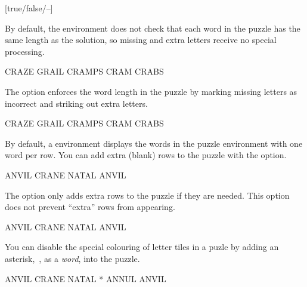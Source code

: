 \documentclass[svgnames]{report}
\begin{document}
  [true/false/--]

  By default, the  environment does not check that each
  word in the puzzle has the same length as the solution, so missing
  and extra letters receive no special processing.

  \begin{example}
  \begin{wordle}[strict=false]{CRAZE} %
    GRAIL
    CRAMPS
    CRAM
    CRABS
  \end{wordle}
  \end{example}

  The  option enforces the word length in the puzzle by
  marking missing letters as incorrect and striking out extra letters.

  \begin{example}
  \begin{wordle}[strict]{CRAZE}
    GRAIL
    CRAMPS
    CRAM
    CRABS
  \end{wordle}
  \end{example}


  By default, a  environment displays the words
  in the puzzle environment with one word per row. You can add extra
  (blank) rows to the puzzle with the  option.

  \begin{example}
  \begin{wordle}[rows=4]{ANVIL}
    CRANE
    NATAL
    ANVIL
  \end{wordle}
  \end{example}

  The  option only adds extra rows to the puzzle if they
  are needed. This option does not prevent ``extra'' rows from
  appearing.

  \begin{example}
  \begin{wordle}[rows=2]{ANVIL}
    CRANE
    NATAL
    ANVIL
  \end{wordle}
  \end{example}


  \option[]{*}

  You can disable the special colouring of letter tiles in a
   puzle by adding an asterisk,~\option{*}, as a
  \textit{word}, into the puzzle.

  \begin{example}
  \begin{wordle}{ANVIL}
    CRANE
    NATAL
    *      %
    ANNUL
    ANVIL
  \end{wordle}
  \end{example}
\end{document}
